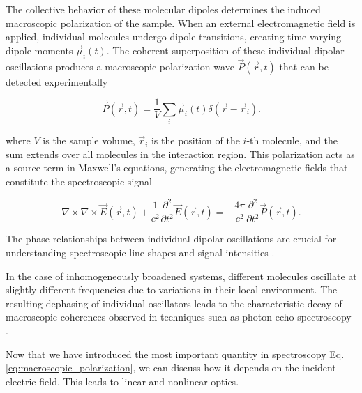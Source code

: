 \noindent 
The collective behavior of these molecular dipoles determines the induced macroscopic polarization of the sample. When an external electromagnetic field is applied, individual molecules undergo dipole transitions, creating time-varying dipole moments $\vec{\mu}_i(t)$. The coherent superposition of these individual dipolar oscillations produces a macroscopic polarization wave $\vec{P}(\vec{r}, t)$ that can be detected experimentally

\begin{equation}
	\vec{P}(\vec{r}, t) = \frac{1}{V} \sum_{i} \vec{\mu}_i(t) \delta(\vec{r} - \vec{r}_i).
	\label{eq:macroscopic_polarization}
\end{equation}

\noindent 
where $V$ is the sample volume, $\vec{r}_i$ is the position of the $i$-th molecule, and the sum extends over all molecules in the interaction region. This polarization acts as a source term in Maxwell's equations, generating the electromagnetic fields that constitute the spectroscopic signal \cite{abramaviciusetal2009coherentmultidimensionaloptical}

\begin{equation}
	\nabla \times \nabla \times \vec{E}(\vec{r}, t) + \frac{1}{c^2} \frac{\partial^2}{\partial t^2} \vec{E}(\vec{r}, t) = - \frac{4 \pi}{c^2} \frac{\partial^2}{\partial t^2} \vec{P}(\vec{r}, t).
\end{equation}

\noindent
{}

\noindent 
The phase relationships between individual dipolar oscillations are crucial for understanding spectroscopic line shapes and signal intensities  . 

In the case of inhomogeneously broadened systems, different molecules oscillate at slightly different frequencies due to variations in their local environment. The resulting dephasing of individual oscillators leads to the characteristic decay of macroscopic coherences observed in techniques such as photon echo spectroscopy \cite{mukamel1995principlesnonlinearoptical}.



\noindent
Now that we have introduced the most important quantity in spectroscopy Eq. \ref{eq:macroscopic_polarization}, we can discuss how it depends on the incident electric field. This leads to linear and nonlinear optics.

